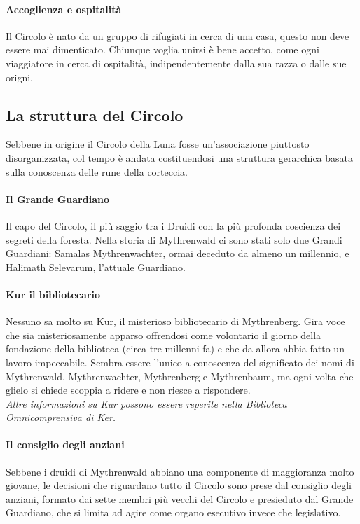 \paragraph{Accoglienza e ospitalità} Il Circolo è nato da un gruppo di rifugiati in cerca di una casa, questo non deve essere mai dimenticato. Chiunque voglia unirsi è bene accetto, come ogni viaggiatore in cerca di ospitalità, indipendentemente dalla sua razza o dalle sue origni.

\subsection{La struttura del Circolo}

Sebbene in origine il Circolo della Luna fosse un'associazione piuttosto disorganizzata, col tempo è andata costituendosi una struttura gerarchica basata sulla conoscenza delle rune della corteccia.

\paragraph{Il Grande Guardiano} Il capo del Circolo, il più saggio tra i Druidi con la più profonda coscienza dei segreti della foresta. Nella storia di Mythrenwald ci sono stati solo due Grandi Guardiani: Samalas Mythrenwachter, ormai deceduto da almeno un millennio, e Halimath Selevarum, l'attuale Guardiano.

\paragraph{Kur il bibliotecario} Nessuno sa molto su Kur, il misterioso bibliotecario di Mythrenberg. Gira voce che sia misteriosamente apparso offrendosi come volontario il giorno della fondazione della biblioteca (circa tre millenni fa) e che da allora abbia fatto un lavoro impeccabile. Sembra essere l'unico a conoscenza del significato dei nomi di Mythrenwald, Mythrenwachter, Mythrenberg e Mythrenbaum, ma ogni volta che glielo si chiede scoppia a ridere e non riesce a rispondere. \\ \textit{Altre informazioni su Kur possono essere reperite nella Biblioteca Omnicomprensiva di Ker.}

\paragraph{Il consiglio degli anziani} Sebbene i druidi di Mythrenwald abbiano una componente di maggioranza molto giovane, le decisioni che riguardano tutto il Circolo sono prese dal consiglio degli anziani, formato dai sette membri più vecchi del Circolo e presieduto dal Grande Guardiano, che si limita ad agire come organo esecutivo invece che legislativo.

